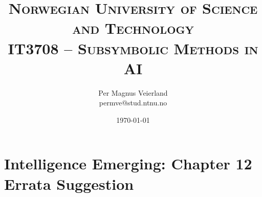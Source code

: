 

\title{
\normalfont \normalsize
\textsc{Norwegian University of Science and Technology\\IT3708 -- Subsymbolic Methods in AI\vspace{-0.2cm}}
}

\author{Per Magnus Veierland\\permve@stud.ntnu.no}

\date{\normalsize\today}




\fancyfoot[C]{}
\maketitle

\vspace{-1.3cm}
\section*{Intelligence Emerging: Chapter 12 Errata Suggestion}
\vspace{-0.15cm}


